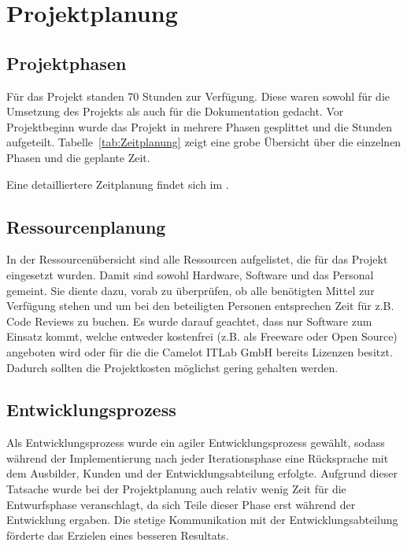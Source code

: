 \section{Projektplanung} 
\label{sec:Projektplanung}

\subsection{Projektphasen}
\label{sec:Projektphasen}
Für das Projekt standen 70 Stunden zur Verfügung. Diese waren sowohl für die Umsetzung des Projekts als auch für die Dokumentation gedacht. Vor Projektbeginn wurde das Projekt in mehrere Phasen gesplittet und die Stunden aufgeteilt. Tabelle~\ref{tab:Zeitplanung} zeigt eine grobe Übersicht über die einzelnen Phasen und die geplante Zeit. 

Eine detailliertere Zeitplanung findet sich im .

\subsection{Ressourcenplanung}
\label{sec:Ressourcenplanung}
In der Ressourcenübersicht  sind alle Ressourcen aufgelistet, die für das Projekt eingesetzt wurden. Damit sind sowohl Hardware, Software und das Personal gemeint. Sie diente dazu, vorab zu überprüfen, ob alle benötigten Mittel zur Verfügung stehen und um bei den beteiligten Personen entsprechen Zeit für z.B. Code Reviews zu buchen. Es wurde darauf geachtet, dass nur Software zum Einsatz kommt, welche entweder kostenfrei (z.B. als Freeware oder Open Source) angeboten wird oder für die die Camelot ITLab GmbH bereits Lizenzen besitzt. Dadurch sollten die Projektkosten möglichst gering gehalten werden.

\subsection{Entwicklungsprozess}
\label{sec:Entwicklungsprozess}
Als Entwicklungsprozess wurde ein agiler Entwicklungsprozess gewählt, sodass während der Implementierung nach jeder Iterationsphase eine Rücksprache mit dem Ausbilder, Kunden und der Entwicklungsabteilung erfolgte. Aufgrund dieser Tatsache wurde bei der Projektplanung auch relativ wenig Zeit für die Entwurfsphase veranschlagt, da sich Teile dieser Phase erst während der Entwicklung ergaben. Die stetige Kommunikation mit der Entwicklungsabteilung förderte das Erzielen eines besseren Resultats.